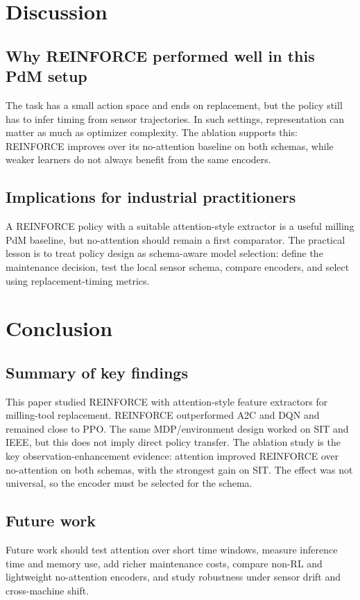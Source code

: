 \documentclass[sn-basic]{sn-jnl}%
\begin{document}
\section{Discussion}
\label{sec:discussion}
\subsection{Why REINFORCE performed well in this PdM setup}
The task has a small action space and ends on replacement, but the policy still has to infer timing from sensor trajectories. In such settings, representation can matter as much as optimizer complexity. The ablation supports this: \textsc{REINFORCE} improves over its no-attention baseline on both schemas, while weaker learners do not always benefit from the same encoders.

\subsection{Implications for industrial practitioners}
A \textsc{REINFORCE} policy with a suitable attention-style extractor is a useful milling PdM baseline, but no-attention should remain a first comparator. The practical lesson is to treat policy design as schema-aware model selection: define the maintenance decision, test the local sensor schema, compare encoders, and select using replacement-timing metrics.


\section{Conclusion}
\label{sec:conclusion}
\subsection{Summary of key findings}
This paper studied \textsc{REINFORCE} with attention-style feature extractors for milling-tool replacement. \textsc{REINFORCE} outperformed \textsc{A2C} and \textsc{DQN} and remained close to \textsc{PPO}. The same MDP/environment design worked on SIT and IEEE, but this does not imply direct policy transfer. The ablation study is the key observation-enhancement evidence: attention improved \textsc{REINFORCE} over no-attention on both schemas, with the strongest gain on SIT. The effect was not universal, so the encoder must be selected for the schema.

\subsection{Future work}
Future work should test attention over short time windows, measure inference time and memory use, add richer maintenance costs, compare non-RL and lightweight no-attention encoders, and study robustness under sensor drift and cross-machine shift.
\end{document}
